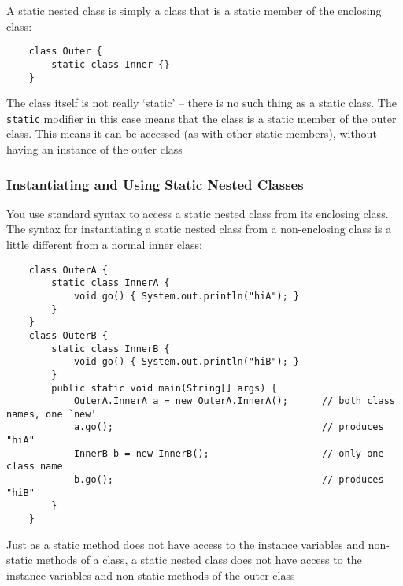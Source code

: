 A static nested class is simply a class that is a static member of the 
enclosing class:
\begin{verbatim}
    class Outer {
        static class Inner {}
    }
\end{verbatim}
The class itself is not really `static' -- there is no such thing as a static 
class. The \verb#static# modifier in this case means that the class is a static 
member of the outer class. This means it can be accessed (as with other static 
members), without having an instance of the outer class

\subsubsection{Instantiating and Using Static Nested Classes}
You use standard syntax to access a static nested class from its enclosing 
class. The syntax for instantiating a static nested class from a non-enclosing 
class is a little different from a normal inner class:
\begin{verbatim}
    class OuterA {
        static class InnerA {
            void go() { System.out.println("hiA"); }
        }
    }
    class OuterB {
        static class InnerB {
            void go() { System.out.println("hiB"); }
        }
        public static void main(String[] args) {
            OuterA.InnerA a = new OuterA.InnerA();      // both class names, one `new'
            a.go();                                     // produces "hiA"
            InnerB b = new InnerB();                    // only one class name
            b.go();                                     // produces "hiB"
        }
    }
\end{verbatim}
Just as a static method does not have access to the instance variables and 
non-static methods of a class, a static nested class does not have access to 
the instance variables and non-static methods of the outer class
